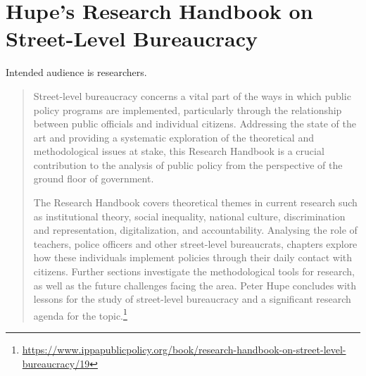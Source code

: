\section{Hupe's Research Handbook on Street-Level Bureaucracy\label{review:hupe_handbook}}
\cite{2019_Hupe}


Intended audience is researchers.


\begin{quote}
Street-level bureaucracy concerns a vital part of the ways in which public policy programs are implemented, particularly through the relationship between public officials and individual citizens. Addressing the state of the art and providing a systematic exploration of the theoretical and methodological issues at stake, this Research Handbook is a crucial contribution to the analysis of public policy from the perspective of the ground floor of government. 

The Research Handbook covers theoretical themes in current research such as institutional theory, social inequality, national culture, discrimination and representation, digitalization, and accountability. Analysing the role of teachers, police officers and other street-level bureaucrats, chapters explore how these individuals implement policies through their daily contact with citizens. Further sections investigate the methodological tools for research, as well as the future challenges facing the area. Peter Hupe concludes with lessons for the study of street-level bureaucracy and a significant research agenda for the topic.\footnote{\href{https://www.ippapublicpolicy.org/book/research-handbook-on-street-level-bureaucracy/19}{https://www.ippapublicpolicy.org/book/research-handbook-on-street-level-bureaucracy/19}}
\end{quote}